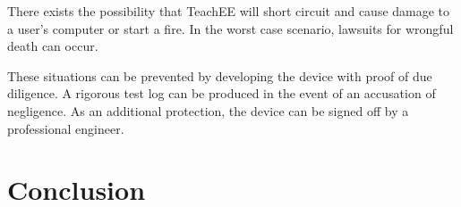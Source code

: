 \documentclass[letterpaper,12pt]{article}
\begin{document}
There exists the possibility that TeachEE will short circuit and cause
damage to a user's computer or start a fire. In the worst case
scenario, lawsuits for wrongful death can occur.

These situations can be prevented by developing the device with proof of due
diligence. A rigorous test log can be produced in the event of an accusation of
negligence. As an additional protection, the device can be signed off by a
professional engineer.

\section{Conclusion}
\newpage


\newpage
\pagestyle{empty}
\end{document}
